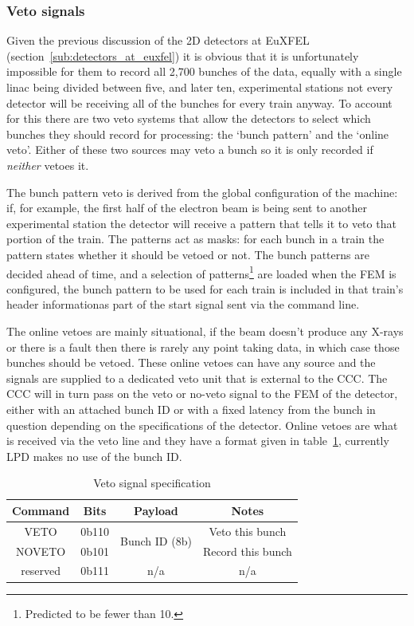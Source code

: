 \subsubsection{Veto signals} %
\label{sub:veto_signal}
Given the previous discussion of the 2D detectors at EuXFEL (section~\ref{sub:detectors_at_euxfel}) it is obvious that it is unfortunately impossible for them to record all 2,700 bunches of the data, equally with a single linac being divided between five, and later ten, experimental stations not every detector will be receiving all of the bunches for every train anyway. To account for this there are two veto systems that allow the detectors to select which bunches they should record for processing: the `bunch pattern' and the `online veto'. Either of these two sources may veto a bunch so it is only recorded if \emph{neither} vetoes it. 

The bunch pattern veto is derived from the global configuration of the machine: if, for example, the first half of the electron beam is being sent to another experimental station the detector will receive a pattern that tells it to veto that portion of the train. The patterns act as masks: for each bunch in a train the pattern states whether it should be vetoed or not. The bunch patterns are decided ahead of time, and a selection of patterns\footnote{Predicted to be fewer than 10.} are loaded when the FEM is configured, the bunch pattern to be used for each train is included in that train's header informationas part of the start signal sent via the command line.

The online vetoes are mainly situational, if the beam doesn't produce any X-rays or there is a fault then there is rarely any point taking data, in which case those bunches should be vetoed. These online vetoes can have any source and the signals are supplied to a dedicated veto unit that is external to the CCC. The CCC will in turn pass on the veto or no-veto signal to the FEM of the detector, either with an attached bunch ID or with a fixed latency from the bunch in question depending on the specifications of the detector. Online vetoes are what is received via the veto line and they have a format given in table~\ref{tab:veto_spec}, currently LPD makes no use of the bunch ID.
\begin{table}
  \begin{center}
  \begin{tabular}{c|c|c|c}
    Command & Bits   & Payload                        & Notes\\
    \hline
    VETO    & 0b110  & \multirow{2}{*}{Bunch ID (8b)} & Veto this bunch \\
    NOVETO  & 0b101  &                                & Record this bunch \\
    reserved& 0b111  & n/a                            & n/a \\
  \end{tabular}
  \end{center}
  \caption{Veto signal specification}
  \label{tab:veto_spec}
\end{table}
